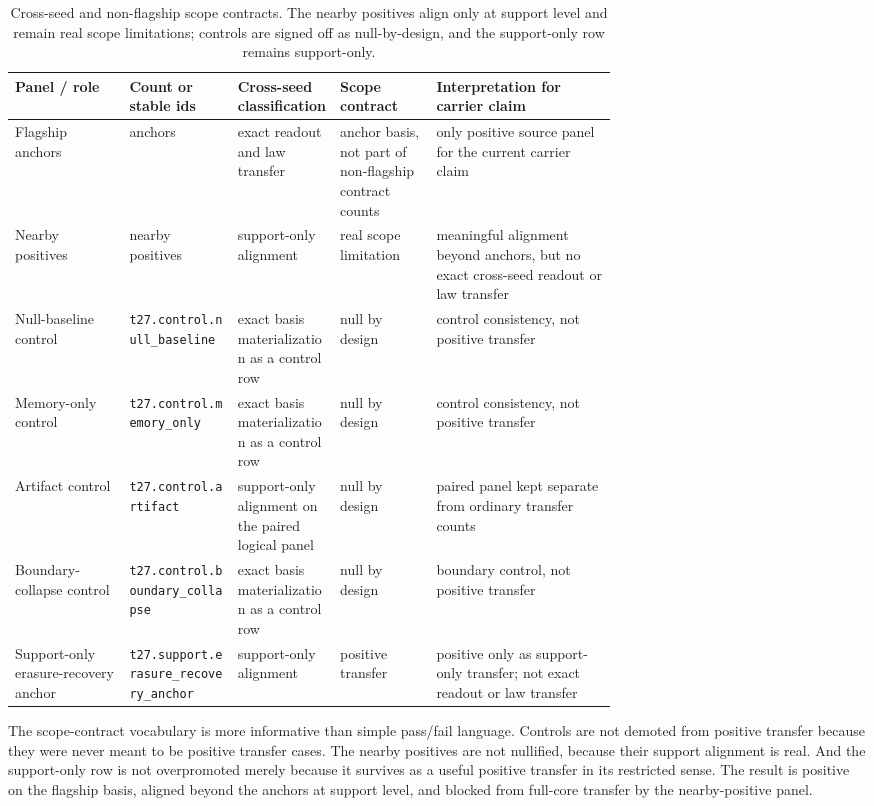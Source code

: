 \documentclass[11pt]{article}
\theoremstyle{definition}
\begin{document}
\begin{table}[t]
\centering
\footnotesize
\caption{Cross-seed and non-flagship scope contracts. The nearby positives align only at
support level and remain real scope limitations; controls are signed off as
null-by-design, and the support-only row remains support-only.}
\label{tab:scope-contracts}
\begin{tabularx}{\linewidth}{@{}>{\raggedright\arraybackslash}p{0.19\linewidth}>{\raggedright\arraybackslash}p{0.18\linewidth}>{\raggedright\arraybackslash}p{0.17\linewidth}>{\raggedright\arraybackslash}p{0.16\linewidth}>{\raggedright\arraybackslash}X@{}}
\toprule
Panel / role & Count or stable ids & Cross-seed classification & Scope contract & Interpretation for carrier claim \\
\midrule
Flagship anchors & 2 anchors & exact readout and law transfer & anchor basis, not part of non-flagship contract counts & only positive source panel for the current carrier claim \\
Nearby positives & 4 nearby positives & support-only alignment & real scope limitation & meaningful alignment beyond anchors, but no exact cross-seed readout or law transfer \\
Null-baseline control & \nolinkurl{t27.control.null_baseline} & exact basis materialization as a control row & null by design & control consistency, not positive transfer \\
Memory-only control & \nolinkurl{t27.control.memory_only} & exact basis materialization as a control row & null by design & control consistency, not positive transfer \\
Artifact control & \nolinkurl{t27.control.artifact} & support-only alignment on the paired logical panel & null by design & paired panel kept separate from ordinary transfer counts \\
Boundary-collapse control & \nolinkurl{t27.control.boundary_collapse} & exact basis materialization as a control row & null by design & boundary control, not positive transfer \\
Support-only erasure-recovery anchor & \nolinkurl{t27.support.erasure_recovery_anchor} & support-only alignment & positive transfer & positive only as support-only transfer; not exact readout or law transfer \\
\bottomrule
\end{tabularx}
\end{table}

The scope-contract vocabulary is more informative than simple pass/fail language.
Controls are not demoted from positive transfer because they were never meant to be
positive transfer cases. The nearby positives are not nullified, because their support
alignment is real. And the support-only row is not overpromoted merely because it
survives as a useful positive transfer in its restricted sense. The result is
positive on the flagship basis, aligned beyond the anchors at support level, and
blocked from full-core transfer by the nearby-positive panel.
\end{document}
